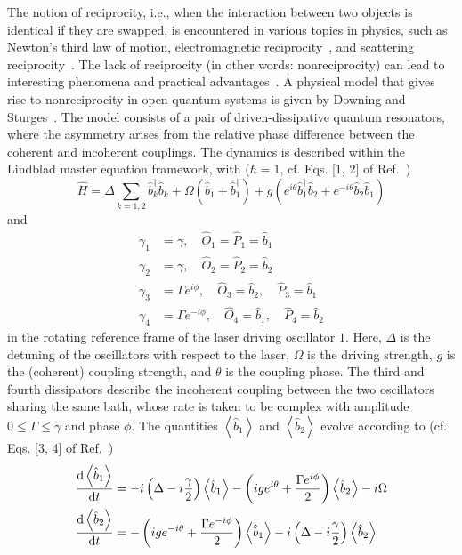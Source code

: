 \documentclass[5p, twocolumn, 10pt, sort&compress]{elsarticle}
\newcounter{bla}
\newcommand{\expval}[1]{\left\langle{#1}\right\rangle}
\newcommand{\bop}{\hat{b}}
\newcommand{\bdag}{\bop^\dagger}
\begin{document}
The notion of reciprocity, i.e., when the interaction between two objects is identical if they are swapped, is encountered in various topics in physics, such as Newton's third law of motion, electromagnetic reciprocity~\cite{Caloz2018}, and scattering reciprocity~\cite{Dek2012}. The lack of reciprocity (in other words: nonreciprocity) can lead to interesting phenomena and practical advantages~\cite{Downing2022}. A physical model that gives rise to nonreciprocity in open quantum systems is given by Downing and Sturges~\cite{Downing2022}. The model consists of a pair of driven-dissipative quantum resonators, where the asymmetry arises from the relative phase difference between the coherent and incoherent couplings. The dynamics is described within the Lindblad master equation framework, with ($\hbar=1$, cf. Eqs. [1, 2] of Ref.~\cite{Downing2022})
\begin{equation}
    \hat{H} = \Delta\sum_{k=1,2}\bdag_k\bop_k + \Omega\left(\bop_1+\bdag_1\right) + g\left(e^{i\theta}\bdag_1\bop_2 + e^{-i\theta}\bdag_2\bop_1\right) 
\end{equation}
and
\begin{subequations}
\begin{align}
    \gamma_1 &= \gamma, \quad \hat{O}_1=\hat{P}_1=\bop_1
    \\
    \gamma_2 &= \gamma, \quad \hat{O}_2=\hat{P}_2=\bop_2
    \\
    \gamma_3 &= \Gamma e^{i\phi}, \quad \hat{O}_3=\bop_2,\quad \hat{P}_3=\bop_1
    \\
    \gamma_4 &= \Gamma e^{-i\phi}, \quad \hat{O}_4 = \bop_1,\quad \hat{P}_4 = \bop_2
\end{align}
\end{subequations}
in the rotating reference frame of the laser driving oscillator $1$. Here, $\Delta$ is the detuning of the oscillators with respect to the laser, $\Omega$ is the driving strength, $g$ is the (coherent) coupling strength, and $\theta$ is the coupling phase.  The third and fourth dissipators describe the incoherent coupling between the two oscillators sharing the same bath, whose rate is taken to be complex with amplitude $0\leq \Gamma\leq \gamma$ and phase $\phi$.  The quantities $\expval{\bop_1}$ and $\expval{\bop_2}$ evolve according to (cf. Eqs. [3, 4] of Ref.~\cite{Downing2022})
\begin{subequations}
\begin{align}
        \odv{\expval{\bop_1}}{t} &=
    -i\left(\Delta -i \frac{\gamma}{2}\right)\expval{\bop_1}-\left(ige^{i\theta}+\frac{\Gamma e^{i\phi}}{2}\right)\expval{\bop_2}-i\Omega \label{eq:ex5_1}
    \\
    \odv{\expval{\bop_2}}{t} &=
    -\left(ige^{-i\theta}+\frac{\Gamma e^{-i\phi}}{2}\right)\expval{\bop_1}-i\left(\Delta-i\frac{\gamma}{2}\right)\expval{\bop_2}\label{eq:ex5_2}
\end{align}
\end{subequations}
\end{document}

